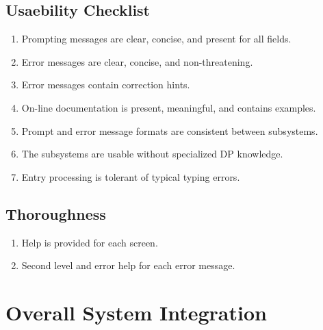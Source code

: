  \section {Usaebility Checklist}
 \begin {enumerate}
  \item Prompting messages are clear, concise, and present for all fields.
  \item Error messages are clear, concise, and non-threatening.
  \item Error messages contain correction hints.
  \item On-line documentation is present, meaningful, and contains
    examples.
  \item Prompt and error message formats are consistent between
    subsystems.
  \item The subsystems are usable without specialized DP knowledge.
  \item Entry processing is tolerant of typical typing errors.
 \end{enumerate}
 \section {Thoroughness}
 \begin{enumerate}
  \item Help is provided for each screen.
  \item Second level and error help for each error message.
 \end{enumerate}
\chapter {Overall System Integration}
